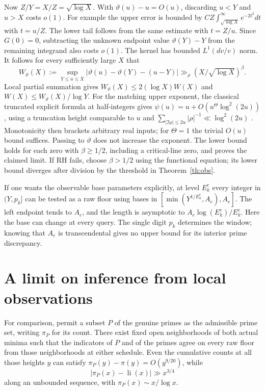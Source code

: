 \documentclass[11pt]{article}
\newcommand{\li}{\operatorname{li}}
\begin{document}
Now $Z/Y=X/Z=\sqrt{\log X}$. With $\vartheta(u)-u=O(u)$, discarding $u<Y$ and $u>X$ costs $o(1)$. For example the upper error is bounded by $CZ\int_{\sqrt{\log X}}^\infty e^{-2t^2}dt$ with $t=u/Z$. The lower tail follows from the same estimate with $t=Z/u$. Since $G(0)=0$, subtracting the unknown endpoint value $\vartheta(Y)-Y$ from the remaining integrand also costs $o(1)$. The kernel has bounded $L^1(dv/v)$ norm. It follows for every sufficiently large $X$ that
\[
 W_{\vartheta}(X):=\sup_{Y\le u\le X}|\vartheta(u)-\vartheta(Y)-(u-Y)|
       \gg_\rho (X/\sqrt{\log X})^\beta .
\]
Local partial summation gives $W_{\vartheta}(X)\le2(\log X)W(X)$ and $W(X)\le W_{\vartheta}(X)/\log Y$. For the matching upper exponent, the classical truncated explicit formula at half-integers gives $\psi(u)=u+O(u^\Theta\log^2(2u))$, using a truncation height comparable to $u$ and $\sum_{|\Im\rho|\le 2u}|\rho|^{-1}\ll\log^2(2u)$ \cite{mv}. Monotonicity then brackets arbitrary real inputs; for $\Theta=1$ the trivial $O(u)$ bound suffices. Passing to $\vartheta$ does not increase the exponent. The lower bound holds for each zero with $\beta\ge1/2$, including a critical-line zero, and proves the claimed limit. If RH fails, choose $\beta>1/2$ using the functional equation; its lower bound diverges after division by the threshold in Theorem~\ref{th:obs}.

If one wants the observable base parameters explicitly, at level $E_k^e$ every integer in $(Y,p_k]$ can be tested as a raw floor using bases in $[\min(Y^{1/E_k^e},A_e),A_e]$. The left endpoint tends to $A_e$, and the length is asymptotic to $A_e\log(E_k^e)/E_k^e$. Here the base can change at every query. The single digit $p_k$ determines the window; knowing that $A_e$ is transcendental gives no upper bound for its interior prime discrepancy.

\section{A limit on inference from local observations}
For comparison, permit a subset $P$ of the genuine primes as the admissible prime set, writing $\pi_P$ for its count. There exist fixed open neighborhoods of both actual minima such that the indicators of $P$ and of the primes agree on every raw floor from those neighborhoods at either schedule. Even the cumulative counts at all those heights $y$ can satisfy $\pi_P(y)-\pi(y)=O(y^{9/20})$, while
\[
       |\pi_P(x)-\li(x)|\gg x^{3/4}
\]
along an unbounded sequence, with $\pi_P(x)\sim x/\log x$.
\end{document}
